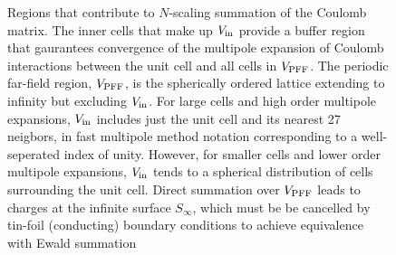 \commentoutA{\documentclass[prb,aps,twocolumn,showpacs,twocolumngrid,superbib]{revtex4}}
\begin{document}
\begin{figure}
\label{regions}
\caption{\label{figure:ReplicateCells} Regions that contribute to $N$-scaling summation of the Coulomb matrix.
The inner cells that make up $V_{\rm in}$ provide a buffer region that gaurantees convergence of the multipole 
expansion of Coulomb interactions between the unit cell and all cells in $V_{\rm PFF}$.  The
periodic far-field region, $V_{\rm PFF}$, is the spherically ordered lattice extending
to infinity but excluding $V_{\rm in}$.  For large cells and high order multipole 
expansions, $V_{\rm in}$ includes just the unit cell and its nearest 27 neigbors, in fast multipole method notation 
corresponding to a well-seperated index of unity.  However, for smaller cells and lower 
order multipole expansions, $V_{\rm in}$ tends to a spherical distribution of cells surrounding the unit cell.   
Direct summation over $V_{\rm PFF}$ leads to charges at the infinite surface  $S_{\infty}$, which must be
be cancelled by tin-foil (conducting) boundary conditions to achieve equivalence with Ewald summation}
\end{figure}

\newpage
\newpage
\end{document}
